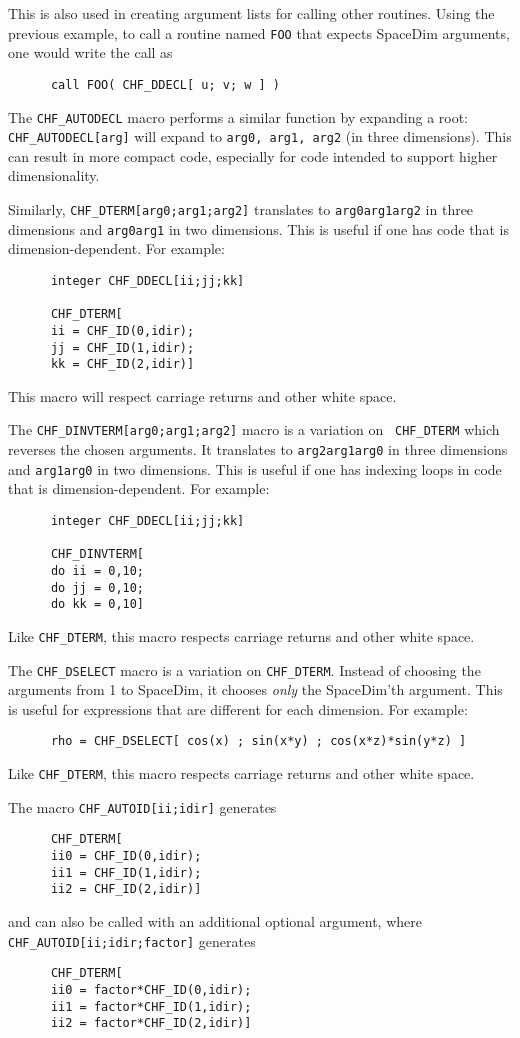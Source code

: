 This is also used in creating argument lists for calling other routines.
Using the previous example, to call a routine named {\tt FOO} that expects SpaceDim
arguments, one would write the call as
\begin{verbatim}
      call FOO( CHF_DDECL[ u; v; w ] )
\end{verbatim}

The {\tt CHF\_AUTODECL} macro performs a similar function by expanding
a root: {\tt CHF\_AUTODECL[arg]} will expand to {\tt arg0, arg1, arg2}
(in three dimensions). This can result in more compact code,
especially for code intended to support higher dimensionality.

Similarly, {\tt CHF\_DTERM[arg0;arg1;arg2]} translates to
{\tt arg0arg1arg2} in three dimensions and {\tt arg0arg1} in
two dimensions.  This is useful if one has 
code that is dimension-dependent.
For example:
\begin{verbatim}
      integer CHF_DDECL[ii;jj;kk]
      
      CHF_DTERM[
      ii = CHF_ID(0,idir);
      jj = CHF_ID(1,idir);
      kk = CHF_ID(2,idir)]
\end{verbatim}
This macro will respect carriage returns and other white space.

The {\tt CHF\_DINVTERM[arg0;arg1;arg2]} macro is a variation on {\tt
CHF\_DTERM} which reverses the chosen arguments.  It translates to
{\tt arg2arg1arg0} in three dimensions and {\tt arg1arg0} in
two dimensions.  This is useful if one has indexing loops in
code that is dimension-dependent.
For example:
\begin{verbatim}
      integer CHF_DDECL[ii;jj;kk]
      
      CHF_DINVTERM[
      do ii = 0,10;
      do jj = 0,10;
      do kk = 0,10]
\end{verbatim}
Like {\tt CHF\_DTERM}, this macro respects carriage returns and other white space.

The {\tt CHF\_DSELECT} macro is a variation on {\tt CHF\_DTERM}.  Instead
of choosing the arguments from 1 to SpaceDim, it chooses {\em only} the 
SpaceDim'th argument.  This is useful for expressions that are different
for each dimension.  For example:
\begin{verbatim}
      rho = CHF_DSELECT[ cos(x) ; sin(x*y) ; cos(x*z)*sin(y*z) ]
\end{verbatim}
Like {\tt CHF\_DTERM}, this macro respects carriage returns and other white space.

The macro {\tt CHF\_AUTOID[ii;idir]} generates
\begin{verbatim}
      CHF_DTERM[
      ii0 = CHF_ID(0,idir);
      ii1 = CHF_ID(1,idir);
      ii2 = CHF_ID(2,idir)]
\end{verbatim}
and can also be called with an additional optional argument,
where {\tt CHF\_AUTOID[ii;idir;factor]} generates
\begin{verbatim}
      CHF_DTERM[
      ii0 = factor*CHF_ID(0,idir);
      ii1 = factor*CHF_ID(1,idir);
      ii2 = factor*CHF_ID(2,idir)]
\end{verbatim}
 
